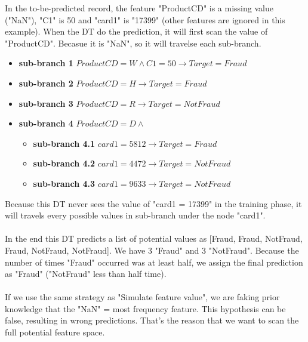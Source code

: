 \documentclass{article}
\begin{document}
In the to-be-predicted record, the feature "ProductCD" is a missing value ("NaN"), "C1" is 50 and "card1" is "17399" (other features are ignored in this example). When the DT do the prediction, it will first scan the value of "ProductCD". Becasue it is "NaN", so it will travelse each sub-branch. 
\begin{itemize}
    \item \textbf{sub-branch 1} $ProductCD = W \land C1 = 50\rightarrow Target = Fraud$
    \item \textbf{sub-branch 2} $ProductCD = H \rightarrow Target = Fraud$
    \item \textbf{sub-branch 3} $ProductCD = R \rightarrow Target = NotFraud$
    \item \textbf{sub-branch 4} $ProductCD = D \land$
    \begin{itemize}
        \item \textbf{sub-branch 4.1} $card1 = 5812 \rightarrow Target = Fraud$
        \item \textbf{sub-branch 4.2} $card1 = 4472 \rightarrow Target = NotFraud$
        \item \textbf{sub-branch 4.3} $card1 = 9633 \rightarrow Target = NotFraud$
    \end{itemize}
\end{itemize}
Because this DT never sees the value of "card1 = 17399" in the training phase, it will travels every possible values in sub-branch under the node "card1". \\\\
In the end this DT predicts a list of potential values as [Fraud, Fraud, NotFraud, Fraud, NotFraud, NotFraud]. We have 3 "Fraud" and 3 "NotFraud". Because the number of times "Fraud" occurred was at least half, we assign the final prediction as "Fraud" ("NotFraud" less than half time).\\\\
If we use the same strategy as "Simulate feature value", we are faking prior knowledge that the "NaN" = most frequency feature. This hypothesis can be false, resulting in wrong predictions. That's the reason that we want to scan the full potential feature space.
\end{document}
